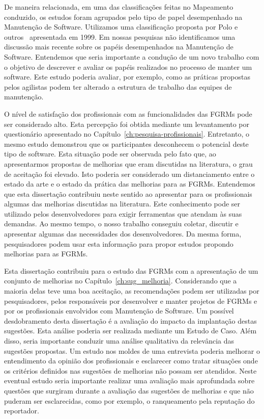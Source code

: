 De maneira relacionada, em uma das classificações feitas no Mapeamento
conduzido, os estudos foram agrupados pelo tipo de papel desempenhado na
Manutenção de Software. Utilizamos uma classificação proposta por Polo e
outros~\cite{Polo1999} apresentada em 1999. Em nossas pesquisas não
identificamos uma discussão mais recente sobre os papéis desempenhados na
Manutenção de Software. Entendemos que seria importante a condução de um novo
trabalho com o objetivo de descrever e avaliar os papéis realizados no processo
de manter um software. Este estudo poderia avaliar, por exemplo, como as
práticas propostas pelos agilistas podem ter alterado a estrutura de trabalho
das equipes de manutenção.

O nível de satisfação dos profissionais com as funcionalidades das FGRMs pode
ser considerado alto. Esta percepção foi obtida mediante um levantamento por
questionário apresentado no Capítulo~\ref{ch:pesquisa-profissionais}.
Entretanto, o mesmo estudo demonstrou que os participantes desconhecem o
potencial deste tipo de software. Esta situação pode ser observada pelo fato
que, ao apresentarmos propostas de melhorias que eram discutidas na literatura,
o grau de aceitação foi elevado. Isto poderia ser considerado um distanciamento
entre o estado da arte e o estado da prática das melhorias para as FGRMs.
Entendemos que esta dissertação contribuiu neste sentido ao apresentar para os
profissionais algumas das melhorias discutidas na literatura. Este conhecimento
pode ser utilizado pelos desenvolvedores para exigir ferramentas que atendam às
suas demandas. Ao mesmo tempo, o nosso trabalho conseguiu coletar, discutir e
apresentar algumas das necessidades dos desenvolvedores. Da mesma forma,
pesquisadores podem usar esta informação para propor estudos propondo melhorias
para as FGRMs.

Esta dissertação contribuiu para o estudo das FGRMs com a apresentação de um
conjunto de melhorias no Capítulo~\ref{ch:sug_melhoria}. Considerando que a
maioria delas teve uma boa aceitação, as recomendações podem ser utilizadas por
pesquisadores, pelos responsáveis por desenvolver e manter projetos de FGRMs e
por os profissionais envolvidos com Manutenção de Software. Um possível
desdobramento desta dissertação é a avaliação do impacto da implantação destas
sugestões. Esta análise poderia ser realizada mediante um Estudo de Caso. Além
disso, seria importante conduzir uma análise qualitativa da relevância das
sugestões propostas. Um estudo nos moldes de uma entrevista poderia melhorar o
entendimento da opinião dos profissionais e esclarecer como tratar situações
onde os critérios definidos nas sugestões de melhorias não possam ser
atendidos. Neste eventual estudo seria importante realizar uma avaliação mais
aprofundada sobre questões que surgiram durante a avaliação das sugestões de
melhorias e que não puderam ser esclarecidas, como por exemplo, o ranqueamento
pela reputação do reportador.

